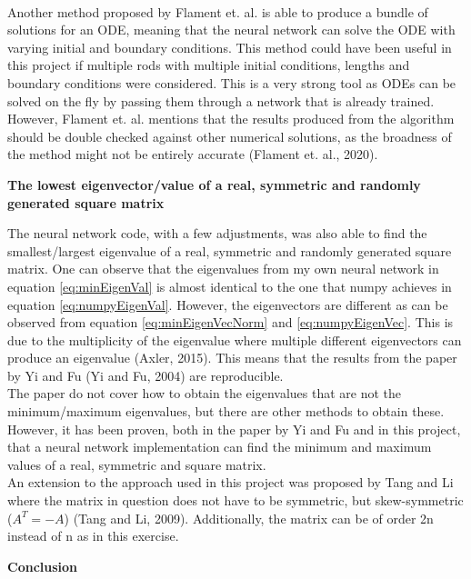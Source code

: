 \documentclass[12pt,a4paper]{article}
\begin{document}
\\
Another method proposed by Flament et. al. is able to produce a bundle of solutions for an ODE, meaning that the neural network can solve the ODE with varying initial and boundary conditions. This method could have been useful in this project if multiple rods with multiple initial conditions, lengths and boundary conditions were considered. This is a very strong tool as ODEs can be solved on the fly by passing them through a network that is already trained. However, Flament et. al. mentions that the results produced from the algorithm should be double checked against other numerical solutions, as the broadness of the method might not be entirely accurate (Flament et. al., 2020). 

\begin{center}
\large{\textbf{The lowest eigenvector/value of a real, symmetric and randomly generated square matrix}}
\end{center}

\noindent The neural network code, with a few adjustments, was also able to find the smallest/largest eigenvalue of a real, symmetric and randomly generated square matrix. One can observe that the eigenvalues from my own neural network in equation \ref{eq:minEigenVal} is almost identical to the one that numpy achieves in equation \ref{eq:numpyEigenVal}. However, the eigenvectors are different as can be observed from equation \ref{eq:minEigenVecNorm} and \ref{eq:numpyEigenVec}. This is due to the multiplicity of the eigenvalue where multiple different eigenvectors can produce an eigenvalue (Axler, 2015). This means that the results from the paper by Yi and Fu (Yi and Fu, 2004) are reproducible. 
\\
The paper do not cover how to obtain the eigenvalues that are not the minimum/maximum eigenvalues, but there are other methods to obtain these. However, it has been proven, both in the paper by Yi and Fu and in this project, that a neural network implementation can find the minimum and maximum values of a real, symmetric and square matrix.
\\
An extension to the approach used in this project was proposed by Tang and Li where the matrix in question does not have to be symmetric, but skew-symmetric ($A^T = -A$) (Tang and Li, 2009). Additionally, the matrix can be of order 2n instead of n as in this exercise. 

\newpage

\begin{center}
\Large{\textbf{Conclusion}}
\end{center}
\end{document}
